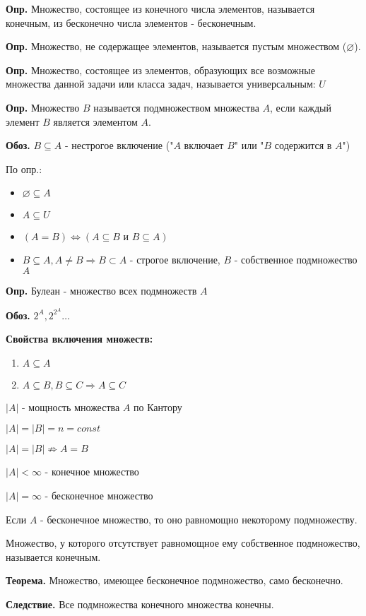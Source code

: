 \documentclass[10pt]{article}
\begin{document}
\par\textbf{Опр.} Множество, состоящее из конечного числа элементов, называется конечным, из бесконечно числа элементов - бесконечным.
\par\textbf{Опр.} Множество, не содержащее элементов, называется пустым множеством ($\varnothing$).
\par\textbf{Опр.} Множество, состоящее из элементов, образующих все возможные множества данной задачи или класса задач, называется универсальным: $U$
\par\textbf{Опр.} Множество $B$ называется подмножеством множества $A$, если каждый элемент $B$ является элементом $A$.
\par\textbf{Обоз.} $B \subseteq  A$ - нестрогое включение ("$A$ включает $B$" или "$B$ содержится в $A$")
\par По опр.:
\begin{itemize}
\item $\varnothing \subseteq A$
\item $A \subseteq U$
\item $(A = B) \iff (A \subseteq B \text{ и } B \subseteq A)$
\item $B \subseteq A, A \neq B \Rightarrow B \subset A$ - строгое включение, $B$ - собственное подмножество $A$
\end{itemize}

\par\textbf{Опр.} Булеан - множество всех подмножеств $A$
\par\textbf{Обоз.} $2^A, 2^{2^A}\dots$
\par\textbf{Свойства включения множеств:}
\begin{enumerate}
    \item $A \subseteq A$
    \item $A \subseteq B, B \subseteq C \Rightarrow A \subseteq C$
\end{enumerate}

\par $|A|$ - мощность множества $A$ по Кантору
\par $|A|=|B|=n=const$
\par $|A|=|B| \not\Rightarrow A=B$
\par $|A| < \infty$ - конечное множество
\par $|A| = \infty$ - бесконечное множество
\par Если $A$ - бесконечное множество, то оно равномощно некоторому подмножеству.
\par Множество, у которого отсутствует равномощное ему собственное подмножество, называется конечным.
\par\textbf{Теорема.} Множество, имеющее бесконечное подмножество, само бесконечно.
\par\textbf{Следствие.} Все подмножества конечного множества конечны.
\end{document}
